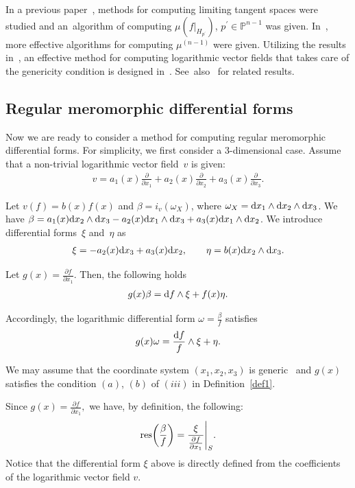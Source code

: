 \documentclass[pdftex]{sigma}%
\numberwithin{equation}{section}
\begin{document}
In a previous paper~\cite{NT18b}, methods for computing limiting tangent spaces were studied and an~algorithm of computing $ \mu(f|_{H_{p^{\prime}}})$, $p^{\prime} \in {\mathbb P}^{n-1} $ was given. In~\cite{NT17b,NT19b}, more effective algorithms for computing $ \mu^{(n-1)} $ were given. Utilizing the results in~\cite{NT17b,NT19b}, an effective method for compu\-ting logarithmic vector fields that takes care of the genericity condition is designed in~\cite{NT19a, TN20}. See~also~\cite{TN20a} for related results.

\subsection{Regular meromorphic differential forms}

Now we are ready to consider a method for computing regular meromorphic differential forms. For simplicity, we first consider a 3-dimensional case. Assume that a non-trivial logarithmic vector field~$v$ is given:
\begin{gather*}
v=a_1(x)\frac{\partial}{\partial x_1} + a_2(x)\frac{\partial}{\partial x_2}+a_3(x)\frac{\partial}{\partial x_3}.
\end{gather*}

Let $v(f)=b(x)f(x)$ and $\beta=i_v(\omega_X) $, where $\omega_X={\rm d}x_1\wedge {\rm d}x_2\wedge {\rm d}x_3$. We have $\beta=a_1(x){\rm d}x_2\wedge {\rm d}x_3-a_2(x){\rm d}x_1\wedge {\rm d}x_3+a_3(x){\rm d}x_1\wedge {\rm d}x_2$.
We introduce differential forms~$ \xi$ and~$\eta$ as
\begin{gather*}
\xi=-a_2(x){\rm d}x_3+a_3(x){\rm d}x_2, \qquad
\eta =b(x){\rm d}x_2\wedge {\rm d}x_3.
\end{gather*}

Let $g(x)=\frac{\partial f}{\partial x_1}$. Then, the following holds
\begin{gather*}
g(x)\beta= {\rm d}f\wedge \xi + f(x)\eta.
\end{gather*}

Accordingly, the logarithmic differential form $ \omega=\frac{\beta}{f} $ satisfies
\begin{gather*}
g(x)\omega=\frac{{\rm d}f}{f} \wedge \xi + \eta.
\end{gather*}

We may assume that the coordinate system $(x_1,x_2,x_3)$ is generic~\cite{NT19a} and $g(x)$ satisfies the condition $(a)$, $(b)$ of $(iii)$ in Definition~\ref{def1}.


Since $ g(x) = \frac{\partial f}{\partial x_1}, $ we have, by definition, the following:
\begin{gather*}
{\rm res}\bigg(\frac{\beta}{f}\bigg) = \frac{\xi}{\frac{\partial f}{\partial x_1}}\Bigg|_S.
\end{gather*}
Notice that the differential form $ \xi$ above is directly defined from the coefficients of the logarithmic vector field $v$.
\end{document}
